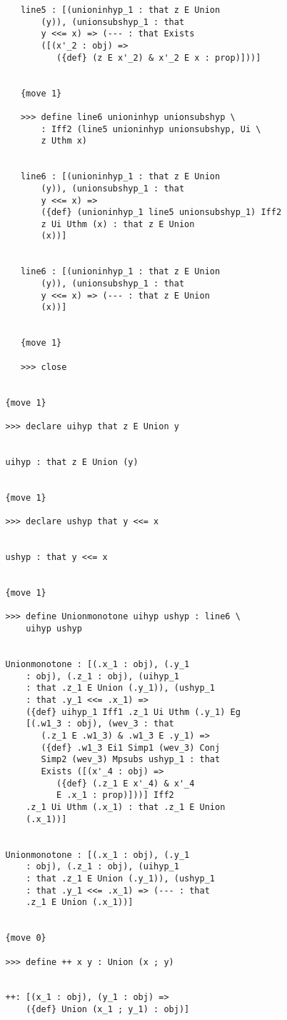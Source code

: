 \documentclass[12pt]{article}
\begin{document}
\begin{verbatim}
      line5 : [(unioninhyp_1 : that z E Union 
          (y)), (unionsubshyp_1 : that 
          y <<= x) => (--- : that Exists 
          ([(x'_2 : obj) => 
             ({def} (z E x'_2) & x'_2 E x : prop)]))]


      {move 1}

      >>> define line6 unioninhyp unionsubshyp \
          : Iff2 (line5 unioninhyp unionsubshyp, Ui \
          z Uthm x)


      line6 : [(unioninhyp_1 : that z E Union 
          (y)), (unionsubshyp_1 : that 
          y <<= x) => 
          ({def} (unioninhyp_1 line5 unionsubshyp_1) Iff2 
          z Ui Uthm (x) : that z E Union 
          (x))]


      line6 : [(unioninhyp_1 : that z E Union 
          (y)), (unionsubshyp_1 : that 
          y <<= x) => (--- : that z E Union 
          (x))]


      {move 1}

      >>> close


   {move 1}

   >>> declare uihyp that z E Union y


   uihyp : that z E Union (y)


   {move 1}

   >>> declare ushyp that y <<= x


   ushyp : that y <<= x


   {move 1}

   >>> define Unionmonotone uihyp ushyp : line6 \
       uihyp ushyp


   Unionmonotone : [(.x_1 : obj), (.y_1 
       : obj), (.z_1 : obj), (uihyp_1 
       : that .z_1 E Union (.y_1)), (ushyp_1 
       : that .y_1 <<= .x_1) => 
       ({def} uihyp_1 Iff1 .z_1 Ui Uthm (.y_1) Eg 
       [(.w1_3 : obj), (wev_3 : that 
          (.z_1 E .w1_3) & .w1_3 E .y_1) => 
          ({def} .w1_3 Ei1 Simp1 (wev_3) Conj 
          Simp2 (wev_3) Mpsubs ushyp_1 : that 
          Exists ([(x'_4 : obj) => 
             ({def} (.z_1 E x'_4) & x'_4 
             E .x_1 : prop)]))] Iff2 
       .z_1 Ui Uthm (.x_1) : that .z_1 E Union 
       (.x_1))]


   Unionmonotone : [(.x_1 : obj), (.y_1 
       : obj), (.z_1 : obj), (uihyp_1 
       : that .z_1 E Union (.y_1)), (ushyp_1 
       : that .y_1 <<= .x_1) => (--- : that 
       .z_1 E Union (.x_1))]


   {move 0}

   >>> define ++ x y : Union (x ; y)


   ++: [(x_1 : obj), (y_1 : obj) => 
       ({def} Union (x_1 ; y_1) : obj)]



\end{verbatim}
\end{document}
